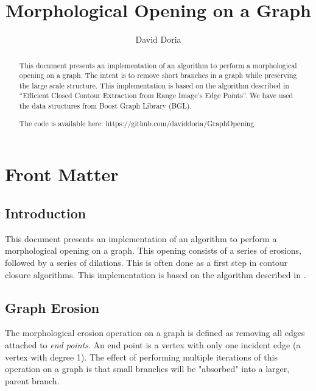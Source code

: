 \documentclass{ComputationalAlgorithmsArticle}
\title{Morphological Opening on a Graph}
\author{David Doria}
\newcommand{\IJhandlerIDnumber}{3250}
\begin{document}
\IJhandlefooter{\IJhandlerIDnumber}


\ifpdf
\else
\fi


\maketitle


\ifhtml
\chapter*{Front Matter\label{front}}
\fi

\begin{abstract}
\noindent

This document presents an implementation of an algorithm to perform a morphological opening on a graph. The intent is to remove short branches in a graph while preserving the large scale structure. This implementation is based on the algorithm described in ``Efficient Closed Contour Extraction from Range Image's Edge Points''. We have used the data structures from Boost Graph Library (BGL).

The code is available here:
https://github.com/daviddoria/GraphOpening

\end{abstract}

\IJhandlenote{\IJhandlerIDnumber}

\tableofcontents
\section{Introduction}
This document presents an implementation of an algorithm to perform a morphological opening on a graph. This opening consists of a series of erosions, followed by a series of dilations. This is often done as a first step in contour closure algorithms. This implementation is based on the algorithm described in \cite{Sappa}.

\section{Graph Erosion}
The morphological erosion operation on a graph is defined as removing all edges attached to \emph{end points}. An end point is a vertex with only one incident edge (a vertex with degree 1). The effect of performing multiple iterations of this operation on a graph is that small branches will be "absorbed" into a larger, parent branch.
\end{document}

